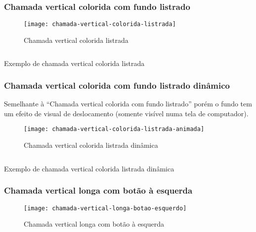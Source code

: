 \subsubsection{Chamada vertical colorida com fundo listrado}

\begin{figure}[!ht]
    \centering
    \texttt{[image: chamada-vertical-colorida-listrada]}
    \caption{Chamada vertical colorida listrada}\label{RS0001:fig:chamada-vertical-colorida-listrada}
\end{figure}

\begin{code}
    \inputminted[label=chamada-vertical-colorida-listrada.html]{html}{../RS0001/anexos/chamada-vertical-colorida-listrada.html}
    \caption{Exemplo de chamada vertical colorida listrada}\label{RS0001:code:exemplo-chamada-vertical-colorida-listrada}
\end{code}


\subsubsection{Chamada vertical colorida com fundo listrado dinâmico}

Semelhante à ``Chamada vertical colorida com fundo listrado'' porém o fundo tem um efeito de visual de deslocamento (somente visível numa tela de computador).

\begin{figure}[!ht]
    \centering
    \texttt{[image: chamada-vertical-colorida-listrada-animada]}
    \caption{Chamada vertical colorida listrada dinâmica}\label{RS0001:fig:chamada-vertical-colorida-listrada-animada}
\end{figure}

\begin{code}
    \inputminted[label=chamada-vertical-colorida-listrada-animada.html]{html}{../RS0001/anexos/chamada-vertical-colorida-listrada-animada.html}
    \caption{Exemplo de chamada vertical colorida listrada dinâmica}\label{RS0001:code:exemplo-chamada-vertical-colorida-listrada-animada}
\end{code}


\subsubsection{Chamada vertical longa com botão à esquerda}

\begin{figure}[!ht]
    \centering
    \texttt{[image: chamada-vertical-longa-botao-esquerdo]}
    \caption{Chamada vertical longa com botão à esquerda}\label{RS0001:fig:chamada-vertical-longa-botao-esquerdo}
\end{figure}

